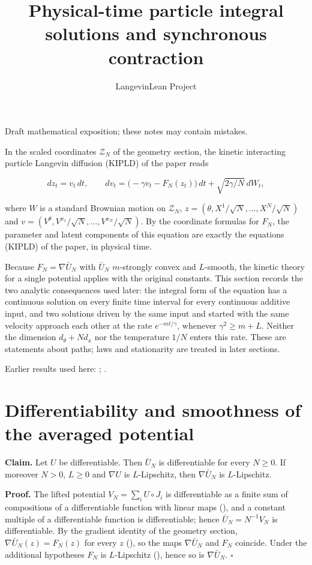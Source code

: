 \documentclass[11pt,a4paper]{article}
\title{\texorpdfstring{Physical-time particle integral solutions and synchronous contraction}{Physical-time particle integral solutions and synchronous contraction}}
\author{LangevinLean Project}
\date{}
\begin{document}
\maketitle
Draft mathematical exposition; these notes may contain mistakes.


In the scaled coordinates \(\mathcal Z_N\) of the geometry section, the kinetic interacting particle Langevin diffusion (KIPLD) of the paper reads


\[dz_t=v_t\,dt,\qquad dv_t=\bigl(-\gamma v_t-F_N(z_t)\bigr)\,dt+\sqrt{2\gamma/N}\,dW_t,\]


where \(W\) is a standard Brownian motion on \(\mathcal Z_N\), \(z=(\theta,X^1/\sqrt N,\dots,X^N/\sqrt N)\) and \(v=(V^\theta,V^{x_1}/\sqrt N,\dots,V^{x_N}/\sqrt N)\). By the coordinate formulas for \(F_N\), the parameter and latent components of this equation are exactly the equations (KIPLD) of the paper, in physical time.




Because \(F_N=\nabla\bar U_N\) with \(\bar U_N\) \(m\)-strongly convex and \(L\)-smooth, the kinetic theory for a single potential applies with the original constants. This section records the two analytic consequences used later: the integral form of the equation has a continuous solution on every finite time interval for every continuous additive input, and two solutions driven by the same input and started with the same velocity approach each other at the rate \(e^{-mt/\gamma}\), whenever \(\gamma^2\ge m+L\). Neither the dimension \(d_\theta+Nd_x\) nor the temperature \(1/N\) enters this rate. These are statements about paths; laws and stationarity are treated in later sections.



Earlier results used here: \cite[Section~3.1]{LangevinLean2026Kinetic}; \cite[Section~3.6]{LangevinLean2026Kinetic}.

\section{\texorpdfstring{Differentiability and smoothness of the averaged potential}{Differentiability and smoothness of the averaged potential}}


\textbf{Claim.} Let \(U\) be differentiable. Then \(\bar U_N\) is differentiable for every \(N\ge0\). If moreover \(N>0\), \(L\ge0\) and \(\nabla U\) is \(L\)-Lipschitz, then \(\nabla\bar U_N\) is \(L\)-Lipschitz.




\textbf{Proof.} The lifted potential \(V_N=\sum_iU\circ J_i\) is differentiable as a finite sum of compositions of a differentiable function with linear maps (\cite[Section~3.1.3]{LangevinLean2026IPLA}), and a constant multiple of a differentiable function is differentiable; hence \(\bar U_N=N^{-1}V_N\) is differentiable. By the gradient identity of the geometry section, \(\nabla\bar U_N(z)=F_N(z)\) for every \(z\) (\cite[Section~3.1.2]{LangevinLean2026KIPLMC}), so the maps \(\nabla\bar U_N\) and \(F_N\) coincide. Under the additional hypotheses \(F_N\) is \(L\)-Lipschitz (\cite[Section~3.1.5]{LangevinLean2026KIPLMC}), hence so is \(\nabla\bar U_N\). \(\square\)
\end{document}

